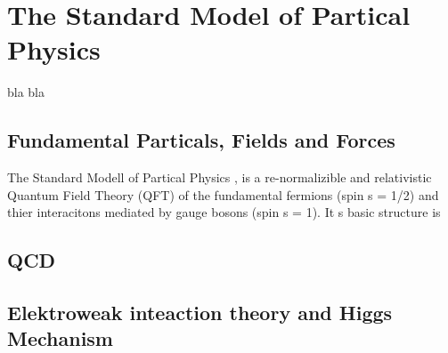\chapter{The Standard Model of Partical Physics}
\label{sec:SM}
bla bla

\section{Fundamental  Particals, Fields and Forces }\label{key:SM 2}

The Standard Modell of Partical Physics \cite{glashow1961partial,glashow1970weak,gross1973asymptotically,politzer1973reliable,politzer1974asymptotic,salam1964electromagnetic,weinberg1967model}, is a re-normalizible and relativistic Quantum Field Theory (QFT) of the fundamental fermions (spin s = 1/2) and thier interacitons mediated by gauge bosons (spin s = 1). It s basic structure is


\clearpage

\clearpage


\section{QCD}


\clearpage
\section{Elektroweak inteaction theory and Higgs Mechanism}


\clearpage